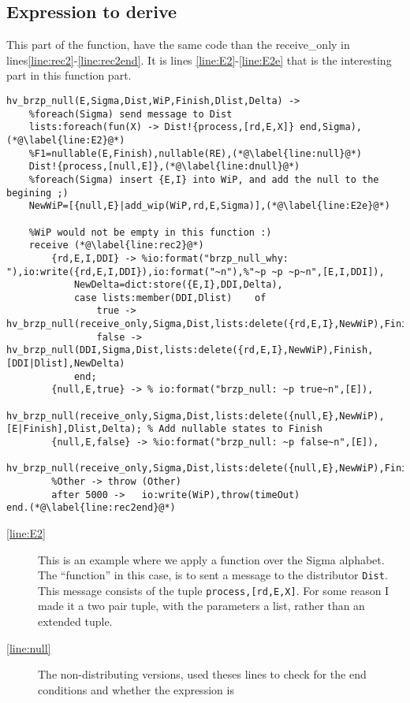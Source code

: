 \subsubsection{}

\subsection{Expression to derive}
\label{sec:expr-derive}

This part of the function, have the same code than the receive\_only in
lines\ref{line:rec2}-\ref{line:rec2end}. It is lines
\ref{line:E2}-\ref{line:E2e} that is the interesting part in this
function part.

\begin{lstlisting}[name=hvp2]
% When we have an RE/E d/di that needs to be derived/etc.
hv_brzp_null(E,Sigma,Dist,WiP,Finish,Dlist,Delta) ->
	%foreach(Sigma) send message to Dist
	lists:foreach(fun(X) -> Dist!{process,[rd,E,X]} end,Sigma),(*@\label{line:E2}@*)
	%F1=nullable(E,Finish),nullable(RE),(*@\label{line:null}@*)
	Dist!{process,[null,E]},(*@\label{line:dnull}@*)
	%foreach(Sigma) insert {E,I} into WiP, and add the null to the begining ;)
	NewWiP=[{null,E}|add_wip(WiP,rd,E,Sigma)],(*@\label{line:E2e}@*)
	
	%WiP would not be empty in this function :)
	receive (*@\label{line:rec2}@*)
		{rd,E,I,DDI} -> %io:format("brzp_null_why:	"),io:write({rd,E,I,DDI}),io:format("~n"),%"~p ~p ~p~n",[E,I,DDI]),
			NewDelta=dict:store({E,I},DDI,Delta),
			case lists:member(DDI,Dlist)	of
				true -> hv_brzp_null(receive_only,Sigma,Dist,lists:delete({rd,E,I},NewWiP),Finish,Dlist,NewDelta);
				false -> hv_brzp_null(DDI,Sigma,Dist,lists:delete({rd,E,I},NewWiP),Finish,[DDI|Dlist],NewDelta)
			end;
		{null,E,true} -> % io:format("brzp_null: ~p true~n",[E]),
							hv_brzp_null(receive_only,Sigma,Dist,lists:delete({null,E},NewWiP),[E|Finish],Dlist,Delta);	% Add nullable states to Finish
		{null,E,false} -> %io:format("brzp_null: ~p false~n",[E]),
			hv_brzp_null(receive_only,Sigma,Dist,lists:delete({null,E},NewWiP),Finish,Dlist,Delta)
		%Other -> throw (Other)
		after 5000 ->	io:write(WiP),throw(timeOut)
end.(*@\label{line:rec2end}@*)

\end{lstlisting}

\begin{description}
  \item[\ref{line:E2}] This is an example where we apply a function
    over the Sigma alphabet. The ``function'' in this case, is to sent
    a message to the distributor \texttt{Dist}. This message consists
    of the tuple \texttt{{process,[rd,E,X]}}. For some reason I made
    it a two pair tuple, with the parameters a list, rather than an
    extended tuple.
  \item[\ref{line:null}] The non-distributing versions, used theses
    lines to check for the end conditions and whether the expression
    is 
\end{description}


